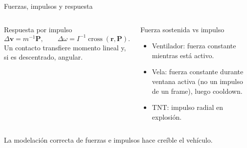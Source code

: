 \documentclass[aspectratio=169,11pt]{beamer}
\newcommand{\inv}[1]{#1^{-1}}
\newcommand{\cross}{\operatorname{cross}}
\begin{document}
\begin{frame}{Fuerzas, impulsos y respuesta}
  \begin{columns}[T]
    \begin{block}{Respuesta por impulso}
      \[
      \Delta\mathbf{v}=\inv{m}\mathbf{P},
      \qquad
      \Delta\omega=\inv{I}\cross(\mathbf{r},\mathbf{P}).
      \]
      Un contacto transfiere momento lineal y, si es descentrado, angular.
    \end{block}
    \begin{block}{Fuerza sostenida vs impulso}
      \begin{itemize}
        \item Ventilador: fuerza constante mientras está activo.
        \item Vela: fuerza constante durante ventana activa (no un impulso de
          un frame), luego cooldown.
        \item TNT: impulso radial en explosión.
      \end{itemize}
    \end{block}
  \end{columns}

  \vspace{0.1cm}
  \begin{center}
    La modelación correcta de fuerzas e impulsos hace creíble el vehículo.
  \end{center}
\end{frame}
\end{document}
